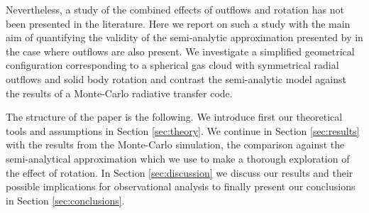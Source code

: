 \documentclass[a4paper,fleqn,usenatbib]{mnras}
\begin{document}
Nevertheless, a study of the combined effects of outflows and
rotation has not been presented in the literature.
Here we report on such a study with the main aim of quantifying the
validity of the semi-analytic approximation presented by
\cite{Garavito14} in the case where outflows are also present. 
We investigate a simplified geometrical configuration corresponding to a
spherical gas cloud with symmetrical radial outflows and solid body
rotation and contrast the semi-analytic model against the results of a
Monte-Carlo radiative transfer code. 

The structure of the paper is the following.
We introduce first our theoretical tools and assumptions
in Section \ref{sec:theory}. We continue in Section \ref{sec:results}
with the results from the Monte-Carlo simulation, the comparison
against the semi-analytical approximation which we use to make a
thorough exploration of the effect of rotation.
In Section \ref{sec:discussion} we discuss our results and their
possible implications for observational analysis to finally present
our conclusions in Section \ref{sec:conclusions}.
\end{document}

